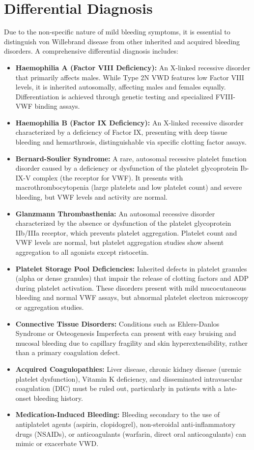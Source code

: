 \section*{Differential Diagnosis}
Due to the non-specific nature of mild bleeding symptoms, it is essential to distinguish von Willebrand disease from other inherited and acquired bleeding disorders. A comprehensive differential diagnosis includes:
\begin{itemize}
    \item \textbf{Haemophilia A (Factor VIII Deficiency):} An X-linked recessive disorder that primarily affects males. While Type 2N VWD features low Factor VIII levels, it is inherited autosomally, affecting males and females equally. Differentiation is achieved through genetic testing and specialized FVIII-VWF binding assays.
    \item \textbf{Haemophilia B (Factor IX Deficiency):} An X-linked recessive disorder characterized by a deficiency of Factor IX, presenting with deep tissue bleeding and hemarthrosis, distinguishable via specific clotting factor assays.
    \item \textbf{Bernard-Soulier Syndrome:} A rare, autosomal recessive platelet function disorder caused by a deficiency or dysfunction of the platelet glycoprotein Ib-IX-V complex (the receptor for VWF). It presents with macrothrombocytopenia (large platelets and low platelet count) and severe bleeding, but VWF levels and activity are normal.
    \item \textbf{Glanzmann Thrombasthenia:} An autosomal recessive disorder characterized by the absence or dysfunction of the platelet glycoprotein IIb/IIIa receptor, which prevents platelet aggregation. Platelet count and VWF levels are normal, but platelet aggregation studies show absent aggregation to all agonists except ristocetin.
    \item \textbf{Platelet Storage Pool Deficiencies:} Inherited defects in platelet granules (alpha or dense granules) that impair the release of clotting factors and ADP during platelet activation. These disorders present with mild mucocutaneous bleeding and normal VWF assays, but abnormal platelet electron microscopy or aggregation studies.
    \item \textbf{Connective Tissue Disorders:} Conditions such as Ehlers-Danlos Syndrome or Osteogenesis Imperfecta can present with easy bruising and mucosal bleeding due to capillary fragility and skin hyperextensibility, rather than a primary coagulation defect.
    \item \textbf{Acquired Coagulopathies:} Liver disease, chronic kidney disease (uremic platelet dysfunction), Vitamin K deficiency, and disseminated intravascular coagulation (DIC) must be ruled out, particularly in patients with a late-onset bleeding history.
    \item \textbf{Medication-Induced Bleeding:} Bleeding secondary to the use of antiplatelet agents (aspirin, clopidogrel), non-steroidal anti-inflammatory drugs (NSAIDs), or anticoagulants (warfarin, direct oral anticoagulants) can mimic or exacerbate VWD.
\end{itemize}

